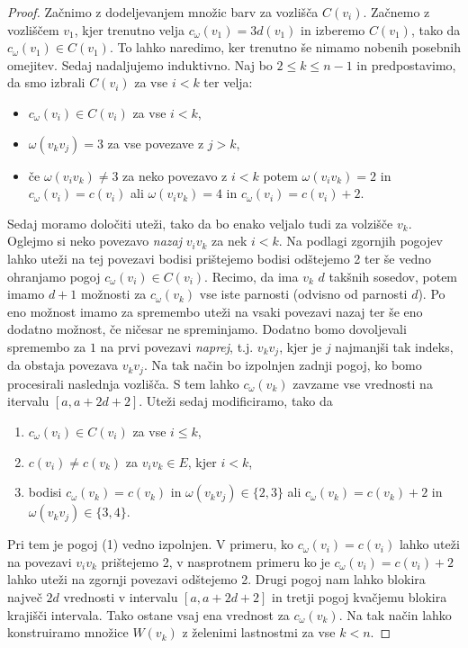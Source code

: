 \documentclass[12pt,a4paper,twoside]{article}
\theoremstyle{definition} %
\theoremstyle{plain} %
\numberwithin{equation}{section}  %
\begin{document}
\begin{proof}
Začnimo z dodeljevanjem množic barv za vozlišča $C(v_i)$. Začnemo z vozliščem $v_1$, kjer trenutno velja $c_{\omega}(v_1) = 3d(v_1)$ in izberemo $C(v_1)$, tako da $c_{\omega}(v_1) \in C(v_1)$. To lahko naredimo, ker trenutno še nimamo nobenih posebnih omejitev. Sedaj nadaljujemo induktivno. Naj bo $ 2 \le k \le n-1$ in predpostavimo, da smo izbrali $C(v_i)$ za vse $i < k$ ter velja:
\begin{itemize}
\item $c_{\omega}(v_i) \in C(v_i)$ za vse $ i < k$,
\item $\omega(v_kv_j) = 3$ za vse povezave z $ j > k$,
\item če $\omega(v_iv_k) \neq 3$ za neko povezavo z $i < k$ potem $\omega(v_iv_k) = 2$ in $c_{\omega}(v_i) = c(v_i)$ ali $\omega(v_iv_k)=4$ in $c_{\omega}(v_i) = c(v_i) + 2$.
\end{itemize}
Sedaj moramo določiti uteži, tako da bo enako veljalo tudi za volzišče $v_k$. Oglejmo si neko povezavo \textit{nazaj} $v_iv_k$ za nek $i < k$. Na podlagi zgornjih pogojev lahko uteži na tej povezavi bodisi prištejemo bodisi odštejemo 2 ter še vedno ohranjamo pogoj $c_{\omega}(v_i) \in C(v_i)$. Recimo, da ima $v_k$ $d$ takšnih sosedov, potem imamo $d+1$ možnosti za $c_{\omega}(v_k)$ vse iste parnosti (odvisno od parnosti $d$). Po eno možnost imamo za spremembo uteži na vsaki povezavi nazaj ter še eno dodatno možnost, če ničesar ne spreminjamo. Dodatno bomo dovoljevali spremembo za $1$ na prvi povezavi \textit{naprej}, t.j. $v_kv_j$, kjer je $j$ najmanjši tak indeks, da obstaja povezava $v_kv_j$. Na tak način bo izpolnjen zadnji pogoj, ko bomo procesirali naslednja vozlišča. S tem lahko $c_{\omega}(v_k)$ zavzame vse vrednosti na itervalu $[a, a + 2d + 2]$. Uteži sedaj modificiramo, tako da

\begin{enumerate}
\item $c_{\omega}(v_i) \in C(v_i)$ za vse $ i \le k$,
\item $c(v_i) \neq c(v_k)$ za $v_iv_k \in E$, kjer $i < k$,
\item bodisi $c_{\omega}(v_k) = c(v_k)$ in $\omega(v_kv_j) \in \{2,3\}$ ali $c_{\omega}(v_k) = c(v_k) + 2$ in $\omega(v_kv_j) \in \{3,4\}$.
\end{enumerate}
Pri tem je pogoj (1) vedno izpolnjen. V primeru, ko $c_{\omega}(v_i) = c(v_i)$ lahko uteži na povezavi $v_iv_k$ prištejemo 2, v nasprotnem primeru ko je $c_{\omega}(v_i) = c(v_i) + 2$ lahko uteži na zgornji povezavi odštejemo 2. Drugi pogoj nam lahko blokira največ $2d$ vrednosti v intervalu $[a, a + 2d + 2]$ in tretji pogoj kvačjemu blokira krajišči intervala. Tako ostane vsaj ena vrednost za $c_{\omega}(v_k)$. Na tak način lahko konstruiramo množice $W(v_k)$ z želenimi lastnostmi za vse $k < n$.


\end{proof}
\end{document}
